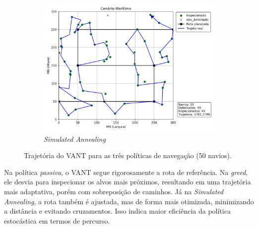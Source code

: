 \begin{figure}[H]
\begin{subfigure}{0.4\textwidth}
        \centering
        \includegraphics[width=\linewidth]{fig/SA.png}
        \caption{\textit{Simulated Annealing}}
        \label{fig:trajetoria_sa}
    \end{subfigure}
    \caption{Trajetória do VANT para as três políticas de navegação (50 navios).}
    \label{fig:trajetorias_comparacao}
\end{figure}

Na política \textit{passiva}, o VANT segue rigorosamente a rota de referência. Na \textit{greed}, ele desvia para inspecionar os alvos mais próximos, resultando em uma trajetória mais adaptativa, porém com sobreposição de caminhos. Já na \textit{Simulated Annealing}, a rota também é ajustada, mas de forma mais otimizada, minimizando a distância e evitando cruzamentos. Isso indica maior eficiência da política estocástica em termos de percurso.

